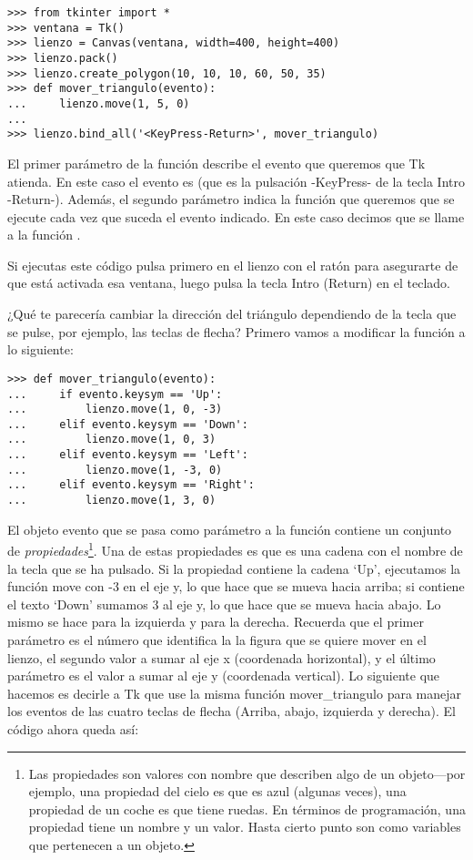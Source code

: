 \begin{listing}
\begin{verbatim}
>>> from tkinter import *
>>> ventana = Tk()
>>> lienzo = Canvas(ventana, width=400, height=400)
>>> lienzo.pack()
>>> lienzo.create_polygon(10, 10, 10, 60, 50, 35)
>>> def mover_triangulo(evento):
...     lienzo.move(1, 5, 0)
...
>>> lienzo.bind_all('<KeyPress-Return>', mover_triangulo)
\end{verbatim}
\end{listing}

El primer parámetro de la función  describe el evento que queremos que Tk atienda.  En este caso el evento es  (que es la pulsación -KeyPress- de la tecla Intro -Return-).  Además, el segundo parámetro indica la función que queremos que se ejecute cada vez que suceda el evento indicado. En este caso decimos que se llame a la función .

Si ejecutas este código pulsa primero en el lienzo con el ratón para asegurarte de que está activada esa ventana, luego pulsa la tecla Intro (Return) en el teclado.

¿Qué te parecería cambiar la dirección del triángulo dependiendo de la tecla que se pulse, por ejemplo, las teclas de flecha?  Primero vamos a modificar la función  a lo siguiente:

\begin{listing}
\begin{verbatim}
>>> def mover_triangulo(evento):
...     if evento.keysym == 'Up':
...         lienzo.move(1, 0, -3)
...     elif evento.keysym == 'Down':
...         lienzo.move(1, 0, 3)
...     elif evento.keysym == 'Left':
...         lienzo.move(1, -3, 0)
...     elif evento.keysym == 'Right':
...         lienzo.move(1, 3, 0)
\end{verbatim}
\end{listing}

El objeto evento que se pasa como parámetro a la función contiene un conjunto de \emph{propiedades}\footnote{Las propiedades son valores con nombre que describen algo de un objeto---por ejemplo, una propiedad del cielo es que es azul (algunas veces), una propiedad de un coche es que tiene ruedas. En términos de programación, una propiedad tiene un nombre y un valor. Hasta cierto punto son como variables que pertenecen a un objeto.}. Una de estas propiedades es  que es una cadena con el nombre de la tecla que se ha pulsado.  Si la propiedad contiene la cadena `Up', ejecutamos la función move con -3 en el eje y, lo que hace que se mueva hacia arriba; si contiene el texto `Down' sumamos 3 al eje y, lo que hace que se mueva hacia abajo. Lo mismo se hace para la izquierda y para la derecha.  Recuerda que el primer parámetro es el número que identifica la la figura que se quiere mover en el lienzo, el segundo valor a sumar al eje x (coordenada horizontal), y el último parámetro es el valor a sumar al eje y (coordenada vertical).  Lo siguiente que hacemos es decirle a Tk que use la misma función mover\_triangulo para manejar los eventos de las cuatro teclas de flecha (Arriba, abajo, izquierda y derecha). El código ahora queda así:

